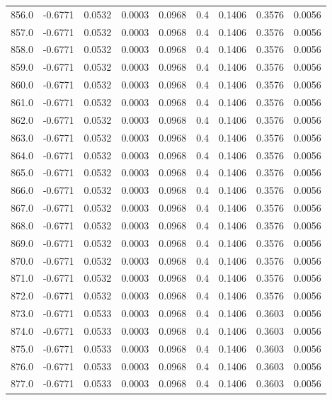 \begin{longtable}{lrrrrrrrr}
856.0 & -0.6771 & 0.0532 & 0.0003 & 0.0968 & 0.4 & 0.1406 & 0.3576 & 0.0056 \\
857.0 & -0.6771 & 0.0532 & 0.0003 & 0.0968 & 0.4 & 0.1406 & 0.3576 & 0.0056 \\
858.0 & -0.6771 & 0.0532 & 0.0003 & 0.0968 & 0.4 & 0.1406 & 0.3576 & 0.0056 \\
859.0 & -0.6771 & 0.0532 & 0.0003 & 0.0968 & 0.4 & 0.1406 & 0.3576 & 0.0056 \\
860.0 & -0.6771 & 0.0532 & 0.0003 & 0.0968 & 0.4 & 0.1406 & 0.3576 & 0.0056 \\
861.0 & -0.6771 & 0.0532 & 0.0003 & 0.0968 & 0.4 & 0.1406 & 0.3576 & 0.0056 \\
862.0 & -0.6771 & 0.0532 & 0.0003 & 0.0968 & 0.4 & 0.1406 & 0.3576 & 0.0056 \\
863.0 & -0.6771 & 0.0532 & 0.0003 & 0.0968 & 0.4 & 0.1406 & 0.3576 & 0.0056 \\
864.0 & -0.6771 & 0.0532 & 0.0003 & 0.0968 & 0.4 & 0.1406 & 0.3576 & 0.0056 \\
865.0 & -0.6771 & 0.0532 & 0.0003 & 0.0968 & 0.4 & 0.1406 & 0.3576 & 0.0056 \\
866.0 & -0.6771 & 0.0532 & 0.0003 & 0.0968 & 0.4 & 0.1406 & 0.3576 & 0.0056 \\
867.0 & -0.6771 & 0.0532 & 0.0003 & 0.0968 & 0.4 & 0.1406 & 0.3576 & 0.0056 \\
868.0 & -0.6771 & 0.0532 & 0.0003 & 0.0968 & 0.4 & 0.1406 & 0.3576 & 0.0056 \\
869.0 & -0.6771 & 0.0532 & 0.0003 & 0.0968 & 0.4 & 0.1406 & 0.3576 & 0.0056 \\
870.0 & -0.6771 & 0.0532 & 0.0003 & 0.0968 & 0.4 & 0.1406 & 0.3576 & 0.0056 \\
871.0 & -0.6771 & 0.0532 & 0.0003 & 0.0968 & 0.4 & 0.1406 & 0.3576 & 0.0056 \\
872.0 & -0.6771 & 0.0532 & 0.0003 & 0.0968 & 0.4 & 0.1406 & 0.3576 & 0.0056 \\
873.0 & -0.6771 & 0.0533 & 0.0003 & 0.0968 & 0.4 & 0.1406 & 0.3603 & 0.0056 \\
874.0 & -0.6771 & 0.0533 & 0.0003 & 0.0968 & 0.4 & 0.1406 & 0.3603 & 0.0056 \\
875.0 & -0.6771 & 0.0533 & 0.0003 & 0.0968 & 0.4 & 0.1406 & 0.3603 & 0.0056 \\
876.0 & -0.6771 & 0.0533 & 0.0003 & 0.0968 & 0.4 & 0.1406 & 0.3603 & 0.0056 \\
877.0 & -0.6771 & 0.0533 & 0.0003 & 0.0968 & 0.4 & 0.1406 & 0.3603 & 0.0056 \\

\end{longtable}
